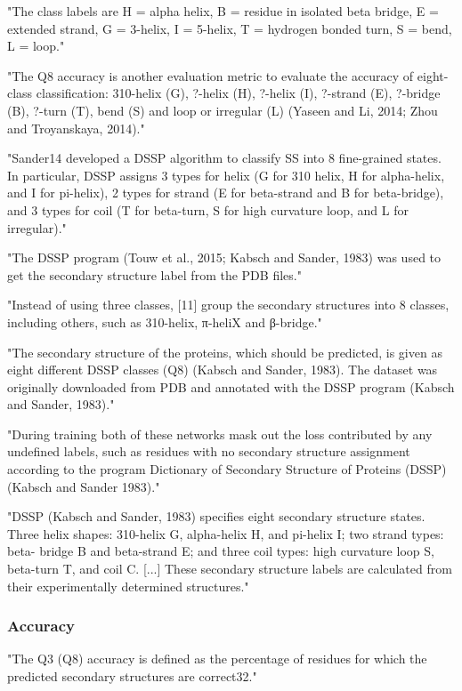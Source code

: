   "The class labels are H = alpha helix, B = residue in isolated beta bridge, E = extended strand, G = 3-helix, I = 5-helix, T = hydrogen bonded turn, S = bend, L = loop." \cite{Lin2016}

  "The Q8 accuracy is another evaluation metric to evaluate the accuracy of eight-class classification: 310-helix (G), ?-helix (H), ?-helix (I), ?-strand (E), ?-bridge (B), ?-turn (T), bend (S) and loop or irregular (L) (Yaseen and Li, 2014; Zhou and Troyanskaya, 2014)." \cite{Fang2017}

  "Sander14 developed a DSSP algorithm to classify SS into 8 fine-grained states. In particular, DSSP assigns 3 types for helix (G for 310 helix, H for alpha-helix, and I for pi-helix), 2 types for strand (E for beta-strand and B for beta-bridge), and 3 types for coil (T for beta-turn, S for high curvature loop, and L for irregular)." \cite{Wang2016}

  "The DSSP program (Touw et al., 2015; Kabsch and Sander, 1983) was used to get the secondary structure label from the PDB files." \cite{Fang2017}

  "Instead of using three classes, [11] group the secondary structures into 8 classes, including others, such as 310-helix, π-heliX and β-bridge." \cite{Hattori2017}

  "The secondary structure of the proteins, which should be predicted, is given as eight different DSSP classes (Q8) (Kabsch and Sander, 1983). The dataset was originally downloaded from PDB and annotated with the DSSP program (Kabsch and Sander, 1983)." \cite{Jurtz2017}

  "During training both of these networks mask out the loss contributed by any undefined labels, such as residues with no secondary structure assignment according to the program Dictionary of Secondary Structure of Proteins (DSSP) (Kabsch and Sander 1983)." \cite{Heffernan2017}

  "DSSP (Kabsch and Sander, 1983) specifies eight secondary structure states. Three helix shapes: 310-helix G, alpha-helix H, and pi-helix I; two strand types: beta- bridge B and beta-strand E; and three coil types: high curvature loop S, beta-turn T, and coil C. [...] These secondary structure labels are calculated from their experimentally determined structures." \cite{Heffernan2017}

  \subsubsection{Accuracy}
  "The Q3 (Q8) accuracy is defined as the percentage of residues for which the predicted secondary structures are correct32." \cite{Wang2016}

